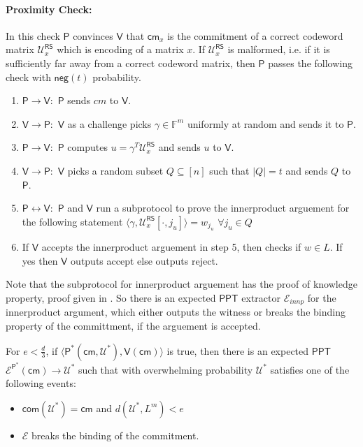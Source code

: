 \documentclass[runningheads]{llncs}
\newcommand{\innp}[2]{\langle #1,#2\rangle}
\def\ppt{\mathsf{PPT}}
\def\extrac{\mathcal{E}}
\def\prover{\mathsf{P}}
\def\verifier{\mathsf{V}}
\def\RS{\mathsf{RS}} %
\def\cm{\mathsf{cm}} %
\def\com{\mathsf{com}} %
\def\negl{\mathsf{neg}}
\def\oracle{\mathcal{U}^{\RS}}
\def\calU{\mathcal{U}}
\def\bbF{\mathbb{F}}
\begin{document}
	\paragraph{\textbf{Proximity Check:}}\label{sec:proximity} In this check $\prover$ convinces $\verifier$ that $\cm_x$ is the commitment of a correct codeword matrix $\oracle_x$ which is encoding of a matrix $x$. If $\oracle_x$ is malformed, i.e. if it is sufficiently far away from a correct codeword matrix, then $\prover$ passes the following check with $\negl(t)$ probability.
	\begin{enumerate}
		\item $\prover \rightarrow \verifier :$ $\prover$ sends $cm$ to $\verifier$.
		\item $\verifier \rightarrow \prover :$ $\verifier$ as a challenge picks $\gamma \in \bbF^m$ uniformly at random and sends it to $\prover$.
		\item $\prover \rightarrow \verifier :$ $\prover$ computes $u=\gamma^T\oracle_x$ and sends $u$ to $\verifier$.
		\item $\verifier \rightarrow \prover :$ $\verifier$ picks a random subset $Q\subseteq [n]$ such that $|Q|=t$ and sends $Q$ to $\prover$.
		\item $\prover \leftrightarrow \verifier: $ $\prover$ and $\verifier$ run a subprotocol to prove the innerproduct arguement for the following statement $\innp{\gamma}{\oracle_x[\cdot,j_u]}=w_{j_u}$ $\forall j_u\in Q$
		\item If $\verifier$ accepts the innerproduct arguement in step 5, then checks if $w\in L$. If yes then $\verifier$ outputs accept else outputs reject.
	\end{enumerate}
	
	Note that the subprotocol for innerproduct arguement has the proof of knowledge property, proof given in \cite{Bulletproofs}. So there is an expected $\ppt$ extractor $\extrac_{innp}$ for the innerproduct argument, which either outputs the witness or breaks the binding property of the committment, if the arguement is accepted.
	\begin{theorem}\label{theo:1}
		For $e < \frac{d}{3} $, if $\innp{\prover^*(\cm, \calU^*)}{\verifier(\cm)} $ is true, then there is an expected $\ppt$ $\extrac^{\prover^*}(\cm) \rightarrow \calU^*$ such that with overwhelming probability $\calU^*$ satisfies one of the following events: 
		\begin{itemize}
			\item $\com(\calU^*) = \cm$ and $ d(\calU^*, L^m) < e$
			\item $\extrac$ breaks the binding of the commitment. 
		\end{itemize} 
		
	\end{theorem}
\end{document}
